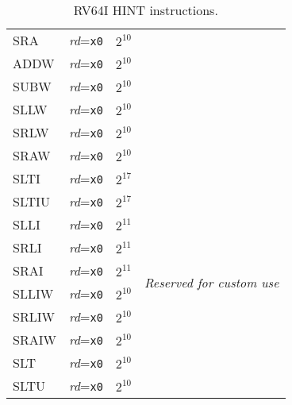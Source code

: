 \begin{table}[hbt]
\begin{tabular}{|l|l|c|l|}
  SRA                   & {\em rd}={\tt x0}                           & $2^{10}$                    & \\ \cline{1-3}
  ADDW                  & {\em rd}={\tt x0}                           & $2^{10}$                    & \\ \cline{1-3}
  SUBW                  & {\em rd}={\tt x0}                           & $2^{10}$                    & \\ \cline{1-3}
  SLLW                  & {\em rd}={\tt x0}                           & $2^{10}$                    & \\ \cline{1-3}
  SRLW                  & {\em rd}={\tt x0}                           & $2^{10}$                    & \\ \cline{1-3}
  SRAW                  & {\em rd}={\tt x0}                           & $2^{10}$                    & \\ \hline \hline
  SLTI                  & {\em rd}={\tt x0}                           & $2^{17}$                    & \multirow{10}{*}{\em Reserved for custom use} \\ \cline{1-3}
  SLTIU                 & {\em rd}={\tt x0}                           & $2^{17}$                    & \\ \cline{1-3}
  SLLI                  & {\em rd}={\tt x0}                           & $2^{11}$                    & \\ \cline{1-3}
  SRLI                  & {\em rd}={\tt x0}                           & $2^{11}$                    & \\ \cline{1-3}
  SRAI                  & {\em rd}={\tt x0}                           & $2^{11}$                    & \\ \cline{1-3}
  SLLIW                 & {\em rd}={\tt x0}                           & $2^{10}$                    & \\ \cline{1-3}
  SRLIW                 & {\em rd}={\tt x0}                           & $2^{10}$                    & \\ \cline{1-3}
  SRAIW                 & {\em rd}={\tt x0}                           & $2^{10}$                    & \\ \cline{1-3}
  SLT                   & {\em rd}={\tt x0}                           & $2^{10}$                    & \\ \cline{1-3}
  SLTU                  & {\em rd}={\tt x0}                           & $2^{10}$                    & \\ \hline
\end{tabular}
\caption{RV64I HINT instructions.}
\label{tab:rv64i-hints}
\end{table}
